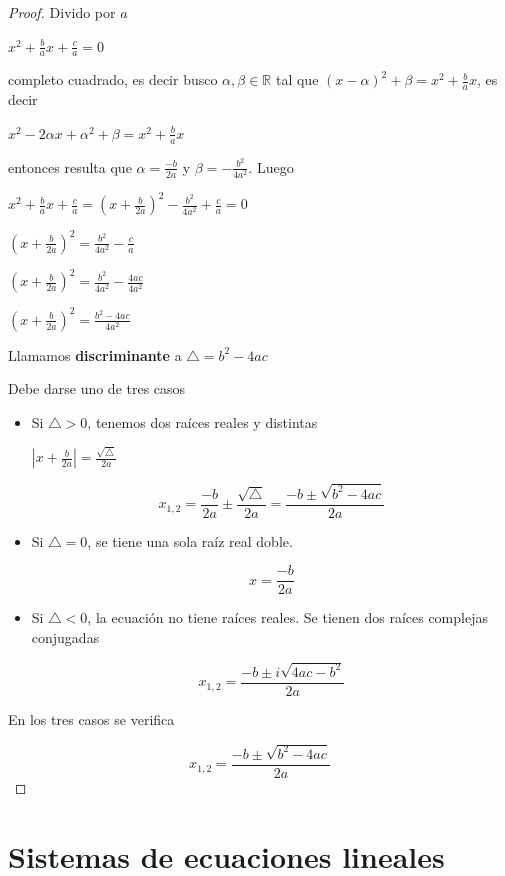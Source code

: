 \begin{proof}
	
Divido por $a$

$ x^2 + \frac{b}{a}x + \frac{c}{a} = 0 $

completo cuadrado, es decir busco $\alpha, \beta \in \mathbb{R}$ tal que $(x-\alpha)^2 + \beta = x^2 + \frac{b}{a}x$, es decir

$ x^2 - 2\alpha x + \alpha^2 + \beta = x^2 + \frac{b}{a}x $

entonces resulta que $\alpha = \frac{-b}{2a}$ y $\beta = - \frac{b^2}{4a^2}$.  Luego

$ x^2 + \frac{b}{a}x + \frac{c}{a} = (x + \frac{b}{2a} )^2 - \frac{b^2}{4a^2} + \frac{c}{a}= 0 $

$(x + \frac{b}{2a} )^2 =  \frac{b^2}{4a^2} - \frac{c}{a} $

$(x + \frac{b}{2a} )^2 =  \frac{b^2}{4a^2} - \frac{4ac}{4a^2} $

$(x + \frac{b}{2a} )^2 =  \frac{b^2 - 4ac}{4a^2} $

Llamamos \textbf{discriminante} a $\triangle = b^2 - 4ac$

Debe darse uno de tres casos

\begin{itemize}

\item Si $\triangle > 0$, tenemos dos raíces reales y distintas

$ |x + \frac{b}{2a}| = \frac{\sqrt{ \triangle }}{2a}$

$$ x_{1,2} = \frac{-b}{2a} \pm \frac{\sqrt{ \triangle }}{2a} = \frac{-b \pm \sqrt{b^2 - 4ac}}{2a}$$

\item Si $\triangle = 0$, se tiene una sola raíz real doble.

$$ x = \frac{-b}{2a}$$

\item Si $\triangle < 0$, la ecuación no tiene raíces reales.  Se tienen dos raíces complejas conjugadas

$$x_{1,2} = \frac{-b \pm i \sqrt{4ac - b^2}}{2a}$$

\end{itemize}

En los tres casos se verifica

$$ x_{1,2} = \frac{-b \pm \sqrt{b^2 - 4ac}}{2a}  $$

\end{proof}




\chapter{Sistemas de ecuaciones lineales}


